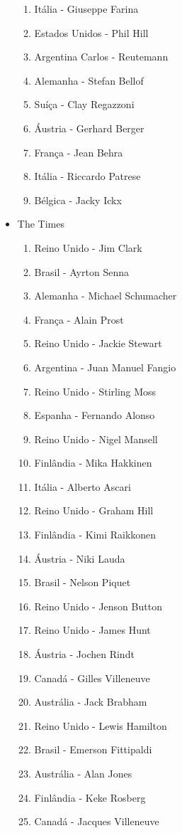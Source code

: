 \documentclass[a4paper,10pt]{article}
\begin{document}
\begin{itemize}
\begin{enumerate}
\item Itália - Giuseppe Farina
\item Estados Unidos - Phil Hill
\item Argentina Carlos - Reutemann
\item Alemanha - Stefan Bellof
\item Suíça - Clay Regazzoni
\item Áustria - Gerhard Berger
\item França - Jean Behra
\item Itália - Riccardo Patrese
\item Bélgica - Jacky Ickx
\end{enumerate}
\item The Times
\begin{enumerate}
\item Reino Unido - Jim Clark
\item Brasil - Ayrton Senna
\item Alemanha - Michael Schumacher
\item França - Alain Prost
\item Reino Unido - Jackie Stewart
\item Argentina - Juan Manuel Fangio
\item Reino Unido - Stirling Moss
\item Espanha - Fernando Alonso
\item Reino Unido - Nigel Mansell
\item Finlândia - Mika Hakkinen
\item Itália - Alberto Ascari
\item Reino Unido - Graham Hill
\item Finlândia - Kimi Raikkonen
\item Áustria - Niki Lauda
\item Brasil - Nelson Piquet
\item Reino Unido - Jenson Button
\item Reino Unido - James Hunt
\item Áustria - Jochen Rindt
\item Canadá - Gilles Villeneuve
\item Austrália - Jack Brabham
\item Reino Unido - Lewis Hamilton
\item Brasil - Emerson Fittipaldi
\item Austrália - Alan Jones
\item Finlândia - Keke Rosberg
\item Canadá - Jacques Villeneuve

\end{enumerate}
\end{itemize}
\end{document}
